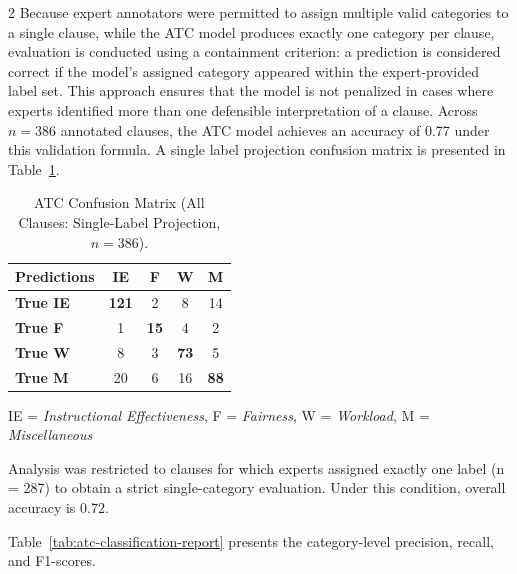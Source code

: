 \documentclass{article}
\begin{document}
\begin{multicols*}{2}
Because expert annotators were permitted to assign multiple valid categories to a single clause, while the ATC model produces exactly one category per clause, evaluation is conducted using a containment criterion: a prediction is considered correct if the model’s assigned category appeared within the expert-provided label set. This approach ensures that the model is not penalized in cases where experts identified more than one defensible interpretation of a clause. Across $n = 386$ annotated clauses, the ATC model achieves an accuracy of 0.77 under this validation formula. A single label projection confusion matrix is presented in Table~\ref{tab:atc_confusion}. 


\begin{table}[H]
\caption{ATC Confusion Matrix (All Clauses: Single-Label Projection, $n=386$).}
\label{tab:atc_confusion}
\centering
\begin{tabular*}{\columnwidth}{@{\extracolsep{\fill}}lcccc}
\toprule
\textbf{Predictions} & \textbf{IE} & \textbf{F} & \textbf{W} & \textbf{M} \\
\midrule
\textbf{True IE} & \textbf{121} & 2  & 8  & 14 \\
\textbf{True F}  & 1   & \textbf{15} & 4  & 2  \\
\textbf{True W}  & 8   & 3  & \textbf{73} & 5  \\
\textbf{True M}  & 20  & 6  & 16 & \textbf{88} \\
\bottomrule
\end{tabular*}
\vspace{0.3em}

\small IE = \textit{Instructional Effectiveness}, F = \textit{Fairness}, W = \textit{Workload}, M = \textit{Miscellaneous}
\end{table}

Analysis was restricted to clauses for which experts assigned exactly one label (n = 287) to obtain a strict single-category evaluation. Under this condition, overall accuracy is 0.72.

Table~\ref{tab:atc-classification-report} presents the category-level precision, recall, and F1-scores.


\end{multicols*}
\end{document}
